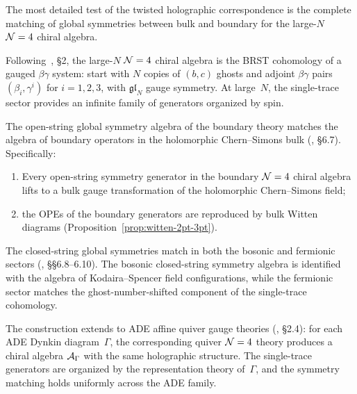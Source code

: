 The most detailed test of the twisted holographic correspondence is the
complete matching of global symmetries between bulk and boundary for the
large-$N$ $\N=4$ chiral algebra.

\begin{definition}[Large-$N$ $\N=4$ chiral algebra]
\label{def:large-n-n4-chiral}
Following~\cite{CG18}, \S2, the large-$N$ $\N=4$ chiral algebra is the
BRST cohomology of a gauged $\beta\gamma$ system: start with
$N$ copies of $(b,c)$ ghosts and adjoint $\beta\gamma$ pairs
$(\beta_i, \gamma^i)$ for $i = 1,2,3$, with $\mathfrak{gl}_N$ gauge
symmetry. At large~$N$, the single-trace sector provides an infinite
family of generators organized by spin.
\end{definition}

\begin{proposition}
\label{prop:open-string-matching}
The open-string global symmetry algebra of the boundary theory matches
the algebra of boundary operators in the holomorphic Chern--Simons bulk
\textup{(}\!\cite{CG18}, \S6.7\textup{)}. Specifically:
\begin{enumerate}[label=\textup{(\roman*)}]
\item Every open-string symmetry generator in the boundary $\N=4$
 chiral algebra lifts to a bulk gauge transformation of the
 holomorphic Chern--Simons field;
\item the OPEs of the boundary generators are reproduced by
 bulk Witten diagrams \textup{(}Proposition~\textup{\ref{prop:witten-2pt-3pt})}.
\end{enumerate}
\end{proposition}

\begin{proposition}
\label{prop:closed-string-matching}
The closed-string global symmetries match in both the bosonic and
fermionic sectors \textup{(}\!\cite{CG18}, \S\S6.8--6.10\textup{)}.
The bosonic closed-string symmetry algebra is identified with the
algebra of Kodaira--Spencer field configurations, while the fermionic
sector matches the ghost-number-shifted component of the single-trace
cohomology.
\end{proposition}

\begin{remark}
\label{rem:affine-quiver-generalization}
The construction extends to ADE affine quiver gauge theories
\textup{(}\!\cite{CG18}, \S2.4\textup{)}: for each ADE Dynkin
diagram~$\Gamma$, the corresponding quiver $\N=4$ theory produces a
chiral algebra $\mathcal A_\Gamma$ with the same holographic structure. The
single-trace generators are organized by the representation theory
of~$\Gamma$, and the symmetry matching holds uniformly across the
ADE family.
\end{remark}

